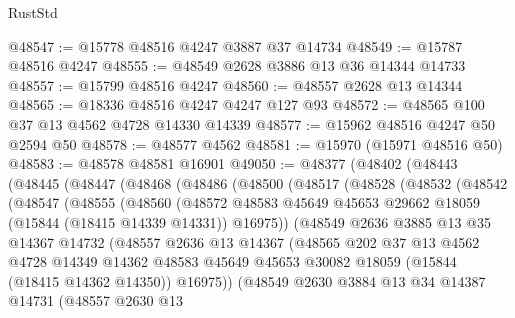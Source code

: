 \begin{lexlean}{RustStd}
\begin{coremodule}
@48547 := @15778 @48516 @4247 @3887 @37 @14734
@48549 := @15787 @48516 @4247
@48555 := @48549 @2628 @3886 @13 @36 @14344 @14733
@48557 := @15799 @48516 @4247
@48560 := @48557 @2628 @13 @14344
@48565 := @18336 @48516 @4247 @4247 @127 @93
@48572 := @48565 @100 @37 @13 @4562 @4728 @14330 @14339
@48577 := @15962 @48516 @4247 @50 @2594 @50
@48578 := @48577 @4562
@48581 := @15970 (@15971 @48516 @50)
@48583 := @48578 @48581 @16901
@49050 := @48377
    (@48402
      (@48443
        (@48445
          (@48447
            (@48468
              (@48486
                (@48500
                  (@48517
                    (@48528
                      (@48532
                        (@48542
                          (@48547
                            (@48555
                              (@48560
                                (@48572
                                  @48583
                                  @45649
                                  @45653
                                  @29662
                                  @18059
                                  (@15844 (@18415 @14339 @14331))
                                  @16975))
                              (@48549
                                @2636
                                @3885
                                @13
                                @35
                                @14367
                                @14732
                                (@48557
                                  @2636
                                  @13
                                  @14367
                                  (@48565
                                    @202
                                    @37
                                    @13
                                    @4562
                                    @4728
                                    @14349
                                    @14362
                                    @48583
                                    @45649
                                    @45653
                                    @30082
                                    @18059
                                    (@15844 (@18415 @14362 @14350))
                                    @16975))
                                (@48549
                                  @2630
                                  @3884
                                  @13
                                  @34
                                  @14387
                                  @14731
                                  (@48557
                                    @2630
                                    @13

\end{coremodule}
\end{lexlean}
